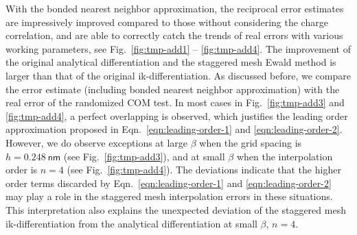 \documentclass[aps,pre,preprint,unsortedaddress]{revtex4}
\begin{document}
{With the bonded nearest neighbor approximation, the
reciprocal error estimates are impressively improved compared
to those without considering the charge correlation,
and are able to correctly
catch the trends of real errors with various working parameters,
see Fig.~\ref{fig:tmp-add1} -- \ref{fig:tmp-add4}.
The improvement of
the original analytical differentiation and the staggered mesh
Ewald method is larger than that of the original ik-differentiation.
As discussed before, we compare the error estimate (including
bonded nearest neighbor approximation)
with the real error of the randomized COM test.
In most cases in Fig.~\ref{fig:tmp-add3} and \ref{fig:tmp-add4},
a perfect overlapping is observed, which justifies the
leading order approximation proposed in
Eqn.~\eqref{eqn:leading-order-1} and \eqref{eqn:leading-order-2}.
However,
we do observe exceptions
at large $\beta$ when the grid spacing is $h=0.248\:\textsf{nm}$
(see Fig.~\ref{fig:tmp-add3}), and
at small $\beta$ when the interpolation order is $n=4$
(see Fig.~\ref{fig:tmp-add4}).
The deviations indicate that the 
higher order terms discarded by
Eqn.~\eqref{eqn:leading-order-1} and \eqref{eqn:leading-order-2}
may play a role in the staggered
mesh interpolation errors in these situations.
This interpretation also
explains the unexpected deviation of the  staggered mesh
ik-differentiation from the analytical differentiation
at  small $\beta$, $n=4$.





}
\end{document}
